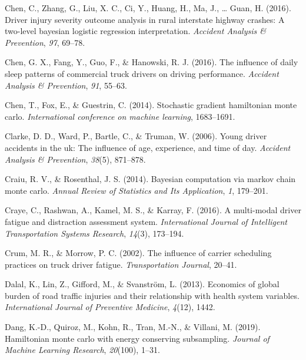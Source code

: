 \documentclass[12pt]{book}
\numberwithin{equation}{chapter}
\begin{document}
\leavevmode\hypertarget{ref-chen2016driver}{}%
Chen, C., Zhang, G., Liu, X. C., Ci, Y., Huang, H., Ma, J., \ldots{} Guan, H. (2016). Driver injury severity outcome analysis in rural interstate highway crashes: A two-level bayesian logistic regression interpretation. \emph{Accident Analysis \& Prevention}, \emph{97}, 69--78.

\leavevmode\hypertarget{ref-chen2016influence}{}%
Chen, G. X., Fang, Y., Guo, F., \& Hanowski, R. J. (2016). The influence of daily sleep patterns of commercial truck drivers on driving performance. \emph{Accident Analysis \& Prevention}, \emph{91}, 55--63.

\leavevmode\hypertarget{ref-chen2014stochastic}{}%
Chen, T., Fox, E., \& Guestrin, C. (2014). Stochastic gradient hamiltonian monte carlo. \emph{International conference on machine learning}, 1683--1691.

\leavevmode\hypertarget{ref-clarke2006young}{}%
Clarke, D. D., Ward, P., Bartle, C., \& Truman, W. (2006). Young driver accidents in the uk: The influence of age, experience, and time of day. \emph{Accident Analysis \& Prevention}, \emph{38}(5), 871--878.

\leavevmode\hypertarget{ref-craiu2014bayesian}{}%
Craiu, R. V., \& Rosenthal, J. S. (2014). Bayesian computation via markov chain monte carlo. \emph{Annual Review of Statistics and Its Application}, \emph{1}, 179--201.

\leavevmode\hypertarget{ref-craye2016multi}{}%
Craye, C., Rashwan, A., Kamel, M. S., \& Karray, F. (2016). A multi-modal driver fatigue and distraction assessment system. \emph{International Journal of Intelligent Transportation Systems Research}, \emph{14}(3), 173--194.

\leavevmode\hypertarget{ref-crum2002influence}{}%
Crum, M. R., \& Morrow, P. C. (2002). The influence of carrier scheduling practices on truck driver fatigue. \emph{Transportation Journal}, 20--41.

\leavevmode\hypertarget{ref-dalal2013economics}{}%
Dalal, K., Lin, Z., Gifford, M., \& Svanström, L. (2013). Economics of global burden of road traffic injuries and their relationship with health system variables. \emph{International Journal of Preventive Medicine}, \emph{4}(12), 1442.

\leavevmode\hypertarget{ref-dang2019hamiltonian}{}%
Dang, K.-D., Quiroz, M., Kohn, R., Tran, M.-N., \& Villani, M. (2019). Hamiltonian monte carlo with energy conserving subsampling. \emph{Journal of Machine Learning Research}, \emph{20}(100), 1--31.
\end{document}

